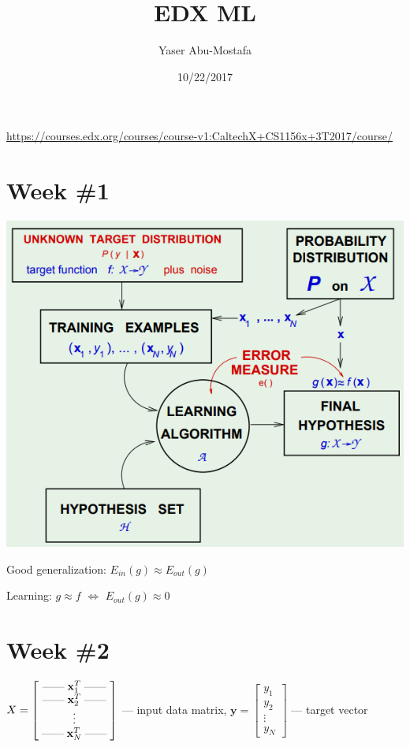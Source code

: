 \documentclass[a4paper,11pt]{article}
\author{Yaser Abu-Mostafa}
\title{EDX ML}
\date{10/22/2017}
\renewcommand{\vec}[1]{\mathbf{#1}}
\begin{document}
\maketitle

\url{https://courses.edx.org/courses/course-v1:CaltechX+CS1156x+3T2017/course/}

\section{Week \#1}

\includegraphics[scale=.66]{structure.png}

Good generalization: $E_{in}(g) \approx E_{out}(g)$

Learning: $g \approx f$  $\Longleftrightarrow$  $E_{out}(g) \approx 0$

\textellipsis

\section{Week \#2}

\def\iiside{\; \rule[.5ex]{2.0em}{0.2pt} \;}
\def\iicode#1{\texttt{#1}}

\def\iiEin{E_{in}}
\def\iiEout{E_{out}}
\def\iiE{\mathbb{E}}
\def\iiD{\mathcal{D}}
\def\iiH{\mathcal{H}}
\def\iiX{\mathcal{X}}
\def\iiw{\vec{w}}
\def\iix{\vec{x}}
\def\iiy{\vec{y}}

$ X = \begin{bmatrix}
        \iiside \vec{x}_1^T \iiside \\
        \iiside \vec{x}_2^T \iiside \\
                 \vdots             \\
        \iiside \vec{x}_N^T \iiside
      \end{bmatrix} $
--- input data matrix,
$ \vec{y} = \begin{bmatrix} y_1 \\ y_2 \\ \vdots \\ y_N \end{bmatrix} $
--- target vector
\end{document}
